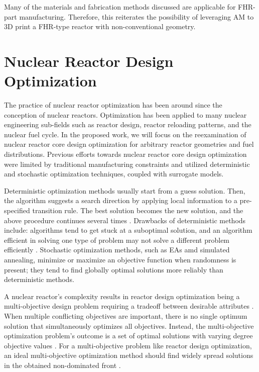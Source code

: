 Many of the materials and fabrication methods discussed are applicable 
for \gls{FHR}-part manufacturing. 
Therefore, this reiterates the possibility of leveraging \gls{AM} to 3D print a
\gls{FHR}-type reactor with non-conventional geometry. 

\section{Nuclear Reactor Design Optimization}
\label{sec:opt}
The practice of nuclear reactor optimization has been around since the 
conception of nuclear reactors. 
Optimization has been applied to many nuclear engineering sub-fields such 
as reactor design, reactor reloading patterns, and the nuclear fuel cycle.  
In the proposed work, we will focus on the reexamination of nuclear reactor core 
design optimization for arbitrary reactor geometries and fuel distributions. 
Previous efforts towards nuclear reactor core design optimization were limited by 
traditional manufacturing constraints and utilized deterministic and stochastic 
optimization techniques, coupled with surrogate models. 

Deterministic optimization methods usually start from a guess solution.
Then, the algorithm suggests a search direction by applying local 
information to a pre-specified transition rule. 
The best solution becomes the new solution, and the above procedure continues 
several times \cite{deb_multi-objective_2001}. 
Drawbacks of deterministic methods include: algorithms tend to get stuck at a 
suboptimal solution, and an algorithm efficient in solving one type of problem 
may not solve a different problem efficiently \cite{deb_multi-objective_2001}. 
Stochastic optimization methods, such as \glspl{EA} amd simulated annealing,  
minimize or maximize an objective function when randomness is present; they 
tend to find globally optimal solutions more reliably than deterministic methods. 

A nuclear reactor's complexity results in reactor design optimization being a 
multi-objective design problem requiring a tradeoff between desirable 
attributes \cite{byrne_evolving_2014,simon_sciences_2019}. 
When multiple conflicting objectives are important, there is no single optimum 
solution that simultaneously optimizes all objectives. 
Instead, the multi-objective optimization problem's outcome is a set of optimal 
solutions with varying degree objective values \cite{deb_multi-objective_2001}. 
For a multi-objective problem like reactor design optimization, 
an ideal multi-objective optimization method should find widely spread solutions 
in the obtained non-dominated front \cite{deb_multi-objective_2001}. 

